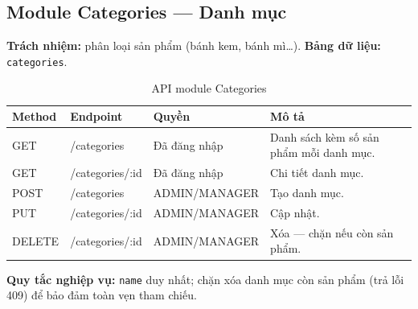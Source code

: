 \documentclass[12pt,a4paper]{report}
\begin{document}
\subsection{Module Categories --- Danh mục}
\textbf{Trách nhiệm:} phân loại sản phẩm (bánh kem, bánh mì\ldots). \textbf{Bảng dữ liệu:} \texttt{categories}.
\begin{table}[H]\centering\small
\begin{tabularx}{\textwidth}{|L{1.5cm}|L{3.6cm}|L{3.4cm}|X|}
\hline
\textbf{Method} & \textbf{Endpoint} & \textbf{Quyền} & \textbf{Mô tả} \\ \hline
GET & /categories & Đã đăng nhập & Danh sách kèm số sản phẩm mỗi danh mục. \\ \hline
GET & /categories/:id & Đã đăng nhập & Chi tiết danh mục. \\ \hline
POST & /categories & ADMIN/MANAGER & Tạo danh mục. \\ \hline
PUT & /categories/:id & ADMIN/MANAGER & Cập nhật. \\ \hline
DELETE & /categories/:id & ADMIN/MANAGER & Xóa --- chặn nếu còn sản phẩm. \\ \hline
\end{tabularx}
\caption{API module Categories}
\end{table}
\textbf{Quy tắc nghiệp vụ:} \texttt{name} duy nhất; chặn xóa danh mục còn sản phẩm (trả lỗi 409) để bảo đảm toàn vẹn tham chiếu.
\end{document}
